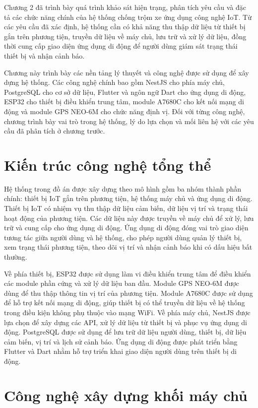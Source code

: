 \documentclass[../DoAn.tex]{subfiles}
\begin{document}
Chương 2 đã trình bày quá trình khảo sát hiện trạng, phân tích yêu cầu và đặc tả các chức năng chính của hệ thống chống trộm xe ứng dụng công nghệ IoT. Từ các yêu cầu đã xác định, hệ thống cần có khả năng thu thập dữ liệu từ thiết bị gắn trên phương tiện, truyền dữ liệu về máy chủ, lưu trữ và xử lý dữ liệu, đồng thời cung cấp giao diện ứng dụng di động để người dùng giám sát trạng thái thiết bị và nhận cảnh báo.

Chương này trình bày các nền tảng lý thuyết và công nghệ được sử dụng để xây dựng hệ thống. Các công nghệ chính bao gồm NestJS cho phía máy chủ, PostgreSQL cho cơ sở dữ liệu, Flutter và ngôn ngữ Dart cho ứng dụng di động, ESP32 cho thiết bị điều khiển trung tâm, module A7680C cho kết nối mạng di động và module GPS NEO-6M cho chức năng định vị. Đối với từng công nghệ, chương trình bày vai trò trong hệ thống, lý do lựa chọn và mối liên hệ với các yêu cầu đã phân tích ở chương trước.

\section{Kiến trúc công nghệ tổng thể}

Hệ thống trong đồ án được xây dựng theo mô hình gồm ba nhóm thành phần chính: thiết bị IoT gắn trên phương tiện, hệ thống máy chủ và ứng dụng di động. Thiết bị IoT có nhiệm vụ thu thập dữ liệu cảm biến, dữ liệu vị trí và trạng thái hoạt động của phương tiện. Các dữ liệu này được truyền về máy chủ để xử lý, lưu trữ và cung cấp cho ứng dụng di động. Ứng dụng di động đóng vai trò giao diện tương tác giữa người dùng và hệ thống, cho phép người dùng quản lý thiết bị, xem trạng thái phương tiện, theo dõi vị trí và nhận cảnh báo khi có dấu hiệu bất thường.

Về phía thiết bị, ESP32 được sử dụng làm vi điều khiển trung tâm để điều khiển các module phần cứng và xử lý dữ liệu ban đầu. Module GPS NEO-6M được dùng để thu thập thông tin vị trí của phương tiện. Module A7680C được sử dụng để hỗ trợ kết nối mạng di động, giúp thiết bị có thể truyền dữ liệu về hệ thống trong điều kiện không phụ thuộc vào mạng WiFi. Về phía máy chủ, NestJS được lựa chọn để xây dựng các API, xử lý dữ liệu từ thiết bị và phục vụ ứng dụng di động. PostgreSQL được sử dụng để lưu trữ dữ liệu người dùng, thiết bị, dữ liệu cảm biến, vị trí và lịch sử cảnh báo. Ứng dụng di động được phát triển bằng Flutter và Dart nhằm hỗ trợ triển khai giao diện người dùng trên thiết bị di động.

\section{Công nghệ xây dựng khối máy chủ}
\label{section:3.server}
\end{document}
